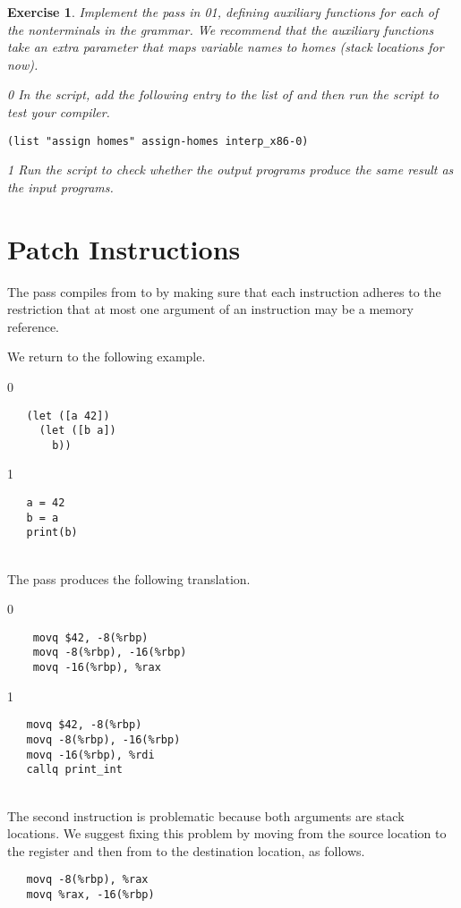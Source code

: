 \documentclass[7x10]{TimesAPriori_MIT}%
\def\racketEd{0}
\def\pythonEd{1}
\def\edition{1}
\newcommand{\racket}[1]{{\if\edition\racketEd{#1}\fi}}
\newcommand{\pythonColor}[0]{}
\newcommand{\python}[1]{{\if\edition\pythonEd\pythonColor #1\fi}}
\newtheorem{exercise}[theorem]{Exercise}
\numberwithin{theorem}{chapter}
\numberwithin{definition}{chapter}
\numberwithin{equation}{chapter}
\begin{document}
\begin{exercise}\normalfont\normalsize
Implement the  pass in
\racket{}\python{}, defining
auxiliary functions for each of the nonterminals in the \LangXVar{}
grammar.  We recommend that the auxiliary functions take an extra
parameter that maps variable names to homes (stack locations for now).
%
{\if\edition\racketEd
In the  script, add the following entry to the
list of  and then run the script to test your compiler.
\begin{lstlisting}
(list "assign homes" assign-homes interp_x86-0)
\end{lstlisting}
\fi}
{\if\edition\pythonEd\pythonColor
Run the  script to check
whether the output programs produce the same result as the input
programs.
\fi}
\end{exercise}


\section{Patch Instructions}
\label{sec:patch-s0}

The  pass compiles from \LangXVar{} to
\LangXInt{} by making sure that each instruction adheres to the
restriction that at most one argument of an instruction may be a
memory reference. 

We return to the following example.\\
\begin{minipage}{0.5\textwidth}
{\if\edition\racketEd
\begin{lstlisting}
   (let ([a 42])
     (let ([b a])
       b))
\end{lstlisting}
\fi}
{\if\edition\pythonEd\pythonColor
\begin{lstlisting}
   a = 42
   b = a
   print(b)
\end{lstlisting}
\fi}
\end{minipage}\\
The  pass produces the following translation. \\
\begin{minipage}{0.5\textwidth}
{\if\edition\racketEd
\begin{lstlisting}
    movq $42, -8(%rbp)
    movq -8(%rbp), -16(%rbp)
    movq -16(%rbp), %rax
\end{lstlisting}
\fi}
{\if\edition\pythonEd\pythonColor
\begin{lstlisting}
   movq $42, -8(%rbp)
   movq -8(%rbp), -16(%rbp)
   movq -16(%rbp), %rdi
   callq print_int
\end{lstlisting}
\fi}
\end{minipage}\\
The second  instruction is problematic because both
arguments are stack locations. We suggest fixing this problem by
moving from the source location to the register  and then
from  to the destination location, as follows.
\begin{lstlisting}
   movq -8(%rbp), %rax
   movq %rax, -16(%rbp)
\end{lstlisting}
\end{document}

